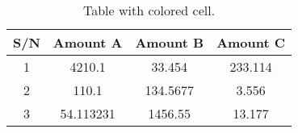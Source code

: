 \documentclass{article}
\begin{document}
		
	\begin{table}[h!]
		\begin{center}
			\caption{Table with colored cell.}
			\label{tab:table1}
			\begin{tabular}{|c|c|c|c|} %
				\hline
				\textbf{S/N} & \textbf{Amount A} & \textbf{Amount B} & \textbf{Amount C}\\
				\hline				
				\cellcolor{blue!25}1 & 4210.1 & 33.454 & 233.114\\
				\cellcolor{green!20}2 & 110.1 & 134.5677 & 3.556\\
				\cellcolor{red!35}3 & 54.113231 & 1456.55 & 13.177\\
				\hline
			\end{tabular}
		\end{center}
	\end{table}
	
\end{document}
